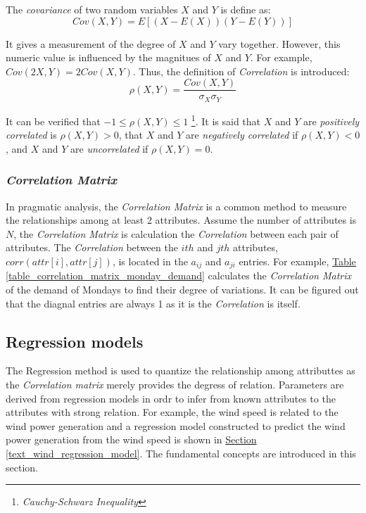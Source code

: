 \documentclass[12pt,a4paper]{report}
\begin{document}
        The \emph{covariance} of two random variables $X$ and $Y$ is define as:
        \begin{equation}
            Cov(X,Y)=E[(X-E(X))(Y-E(Y))]
        \end{equation}

        It gives a measurement of the degree of $X$ and $Y$ vary together. However, this numeric value is influenced by the magnitues of $X$ and $Y$. For example, $Cov(2X,Y) = 2Cov(X,Y)$. Thus, the definition of \emph{Correlation} is introduced:
        \begin{equation}
            \rho(X,Y) = \frac{Cov(X,Y)}{\sigma_X \sigma_Y}
        \end{equation}

        It can be verified that $ -1 \leq \rho(X,Y) \leq 1 $ \footnote{\emph{Cauchy-Schwarz Inequality}}. It is said that $X$ and $Y$ are \emph{positively correlated} is $\rho(X,Y) > 0$, that $X$ and $Y$ are \emph{negatively correlated} if $\rho(X,Y) < 0$, and $X$ and $Y$ are \emph{uncorrelated} if $\rho(X,Y) = 0$.

        \subsubsection{\emph{Correlation Matrix}}
        In pragmatic analysis, the \emph{Correlation Matrix} is a common method to measure the relationships among at least 2 attributes. Assume the number of attributes is $N$, the \emph{Correlation Matrix} is calculation the \emph{Correlation} between each pair of attributes. The \emph{Correlation} between the $ith$ and $jth$ attributes, $corr(attr[i],attr[j])$, is located in the $a_{ij}$ and $a_{ji} $ entries. For example, \hyperref[table_correlation_matrix_monday_demand]{Table \ref*{table_correlation_matrix_monday_demand}} calculates the \emph{Correlation Matrix} of the demand of Mondays to find their degree of variations. It can be figured out that the diagnal entries are always 1 as it is the \emph{Correlation} is itself.
        
        
        \subsection{Regression models}
        The Regression method is used to quantize the relationship among attributtes as the \emph{Correlation matrix} merely provides the degress of relation. Parameters are derived from regression models in ordr to infer from known attributes to the attributes with strong relation. For example, the wind speed is related to the wind power generation and a regression model constructed to predict the wind power generation from the wind speed is shown in \hyperref[text_wind_regression_model]{Section \ref*{text_wind_regression_model}}.
        The fundamental concepts are introduced in this section.
\end{document}
